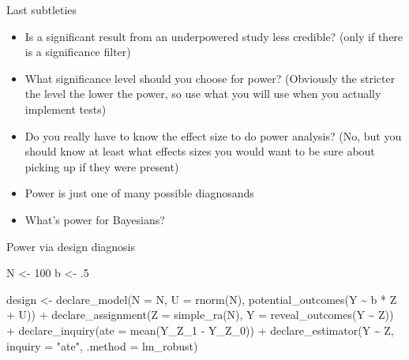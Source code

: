 \documentclass[
  11pt,
  ignorenonframetext,
]{beamer}
\newenvironment{Shaded}{\begin{snugshade}}{\end{snugshade}}
\newcommand{\AttributeTok}[1]{\textcolor[rgb]{0.40,0.45,0.13}{#1}}
\newcommand{\DecValTok}[1]{\textcolor[rgb]{0.68,0.00,0.00}{#1}}
\newcommand{\FunctionTok}[1]{\textcolor[rgb]{0.28,0.35,0.67}{#1}}
\newcommand{\NormalTok}[1]{\textcolor[rgb]{0.00,0.23,0.31}{#1}}
\newcommand{\OtherTok}[1]{\textcolor[rgb]{0.00,0.23,0.31}{#1}}
\newcommand{\SpecialCharTok}[1]{\textcolor[rgb]{0.37,0.37,0.37}{#1}}
\newcommand{\StringTok}[1]{\textcolor[rgb]{0.13,0.47,0.30}{#1}}
\providecommand{\tightlist}{%
  \setlength{\itemsep}{0pt}\setlength{\parskip}{0pt}}\usepackage{longtable,booktabs,array}
\begin{document}
\begin{frame}{Last subtleties}
\protect\hypertarget{last-subtleties}{}
\begin{itemize}
\tightlist
\item
  Is a significant result from an underpowered study less credible?
  (only if there is a significance filter)
\item
  What significance level should you choose for power? (Obviously the
  stricter the level the lower the power, so use what you will use when
  you actually implement tests)
\item
  Do you really have to know the effect size to do power analysis? (No,
  but you should know at least what effects sizes you would want to be
  sure about picking up if they were present)
\item
  Power is just one of many possible diagnosands
\item
  What's power for Bayesians?
\end{itemize}
\end{frame}

\begin{frame}[fragile]{Power via design diagnosis}
\protect\hypertarget{power-via-design-diagnosis}{}
\begin{Shaded}
\begin{Highlighting}[]
\NormalTok{N }\OtherTok{\textless{}{-}} \DecValTok{100}
\NormalTok{b }\OtherTok{\textless{}{-}}\NormalTok{ .}\DecValTok{5}

\NormalTok{design }\OtherTok{\textless{}{-}} 
  \FunctionTok{declare\_model}\NormalTok{(}\AttributeTok{N =}\NormalTok{ N, }
    \AttributeTok{U =} \FunctionTok{rnorm}\NormalTok{(N),}
    \FunctionTok{potential\_outcomes}\NormalTok{(Y }\SpecialCharTok{\textasciitilde{}}\NormalTok{ b }\SpecialCharTok{*}\NormalTok{ Z }\SpecialCharTok{+}\NormalTok{ U)) }\SpecialCharTok{+} 
  \FunctionTok{declare\_assignment}\NormalTok{(}\AttributeTok{Z =} \FunctionTok{simple\_ra}\NormalTok{(N),}
                     \AttributeTok{Y =} \FunctionTok{reveal\_outcomes}\NormalTok{(Y }\SpecialCharTok{\textasciitilde{}}\NormalTok{ Z)) }\SpecialCharTok{+} 
  \FunctionTok{declare\_inquiry}\NormalTok{(}\AttributeTok{ate =} \FunctionTok{mean}\NormalTok{(Y\_Z\_1 }\SpecialCharTok{{-}}\NormalTok{ Y\_Z\_0)) }\SpecialCharTok{+} 
  \FunctionTok{declare\_estimator}\NormalTok{(Y }\SpecialCharTok{\textasciitilde{}}\NormalTok{ Z, }\AttributeTok{inquiry =} \StringTok{"ate"}\NormalTok{, }\AttributeTok{.method =}\NormalTok{ lm\_robust)}
\end{Highlighting}
\end{Shaded}
\end{frame}
\end{document}
